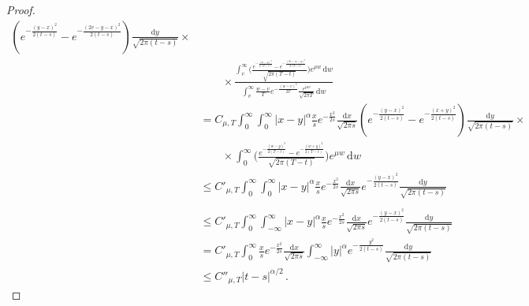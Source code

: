 \begin{lemma}
\begin{proof}
\begin{align*}
		\left( 
		e^{- \frac{ (y - x )^2}{2(t-s) } } 
		-
		e^{- \frac{ (2v - y - x )^2}{2(t-s) } } 
		\right)		
		\frac{ \mathrm d y}{	\sqrt{2\pi (t-s) } }  \times 
		\\
		& \qquad \times 
		\frac{ 
			\displaystyle
			\int_v^\infty 
			\bigg( 
			\frac{ 
				e^{- \frac{ (w - y )^2}{2 (T - t) } } - 
				e^{- \frac{ (2v - w - y )^2}{2 (T - t) } } 
			} 
			{ 
				\sqrt{2\pi (T - t) }
			} 
			\bigg)  e^{\mu w} \,\mathrm d w 
		}{
			\displaystyle
			\int_v^\infty 
			\frac{w - v}{T}
			e^{- \frac{ (w - v )^2}{2T } }
			\frac{ e^{\mu w} }{
				\sqrt{2\pi T} }
			  \,\mathrm d w  
		}    
	\\
	&= C_{\mu, T}
	\int_0^\infty \int_0^\infty |x-y|^\alpha 
	\frac{x}{s} 
	e^{- \frac{x^2}{2s } } 
	\frac{ \mathrm d x}{	\sqrt{2\pi s } }  
	\left( 
	e^{- \frac{ (y - x )^2}{2(t-s) } } 
	-
	e^{- \frac{ (x + y )^2}{2(t-s) } } 
	\right)		
	\frac{ \mathrm d y}{	\sqrt{2\pi (t-s) } }  \times 
	\\
	& \qquad \times 
		\displaystyle
		\int_0^\infty 
		\bigg( 
		\frac{ 
			e^{- \frac{ (w - y )^2}{2 (T - t) } } - 
			e^{- \frac{ ( w + y )^2}{2 (T - t) } } 
		} 
		{ 
			\sqrt{2\pi (T - t) }
		} 
		\bigg)  e^{\mu w} \,\mathrm d w 
	\\
	&\leq
	C'_{\mu, T}
	\int_0^\infty \int_0^\infty |x-y|^\alpha 
	\frac{x}{s} 
	e^{- \frac{x^2}{2s } } 
	\frac{ \mathrm d x}{	\sqrt{2\pi s } }  
	e^{- \frac{ (y - x )^2}{2(t-s) } } 
	\frac{ \mathrm d y}{	\sqrt{2\pi (t-s) } }   
	\\
	\\
	&\leq
	C'_{\mu, T}
	\int_{0}^\infty \int_{-\infty}^\infty |x-y|^\alpha 
	\frac{x}{s} 
	e^{- \frac{x^2}{2s } } 
	\frac{ \mathrm d x}{	\sqrt{2\pi s } }  
	e^{- \frac{ (y - x )^2}{2(t-s) } } 
	\frac{ \mathrm d y}{	\sqrt{2\pi (t-s) } }  
	\\
	&=
	C'_{\mu, T}  \int_{0}^\infty 	\frac{x}{s} 
	e^{- \frac{x^2}{2s } }  \frac{ \mathrm d x}{	\sqrt{2\pi s } }  
	\int_{-\infty}^\infty |y|^\alpha 
	e^{- \frac{ y^2}{2(t-s) } } 
	\frac{ \mathrm d y}{	\sqrt{2\pi (t-s) } }  
	\\
	& \leq 
	C''_{\mu, T} |t-s|^{\alpha / 2}\, .
		\end{align*}
	\end{proof}
\end{lemma}


